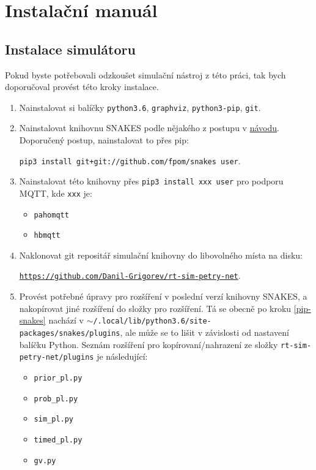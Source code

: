 \chapter{Instalační manuál}
\label{chap:instal-tutor}

\section{Instalace simulátoru}
Pokud byste potřebovali odzkoušet simulační nástroj z této práci, tak bych doporučoval provést této kroky instalace.
\begin{enumerate}
    \item Nainstalovat si balíčky \texttt{python3.6}, \texttt{graphviz}, \texttt{python3-pip}, \texttt{git}.
    \item Nainstalovat knihovnu SNAKES podle nějakého z postupu v \href{https://www.ibisc.univ-evry.fr/~fpommereau/SNAKES/first-steps-with-snakes.html}{návodu}. \label{pip-snakes}
    Doporučený postup, nainstalovat to přes pip:

    \texttt{pip3 install git+git://github.com/fpom/snakes \-\-user}.
    \item Nainstalovat této knihovny přes \texttt{pip3 install xxx \-\-user} pro podporu MQTT, kde \texttt{xxx} je:
    \begin{itemize}
        \item \texttt{pahomqtt}
        \item \texttt{hbmqtt}
    \end{itemize}
    \item Naklonovat git repositář simulační knihovny do libovolného místa na disku:

    \href{https://github.com/Danil-Grigorev/rt-sim-petry-net}{\texttt{https://github.com/Danil-Grigorev/rt-sim-petry-net}}.
    \item Provést potřebné úpravy pro rozšíření  v poslední verzí knihovny SNAKES, a nakopírovat jiné rozšíření do složky pro rozšíření. Tá se obecně po kroku \ref{pip-snakes} nachází v \texttt{$\sim$/.local/lib/python3.6/site-packages/snakes/plugins}, ale může se to lišit v závislosti od nastavení balíčku Python. Seznám rozšíření pro kopírovaní/nahrazení ze složky \texttt{rt-sim-petry-net/plugins} je následující:
    \begin{itemize}
        \item \texttt{prior\_pl.py}
        \item \texttt{prob\_pl.py}
        \item \texttt{sim\_pl.py}
        \item \texttt{timed\_pl.py}
        \item \texttt{gv.py}
    \end{itemize}

\end{enumerate}

